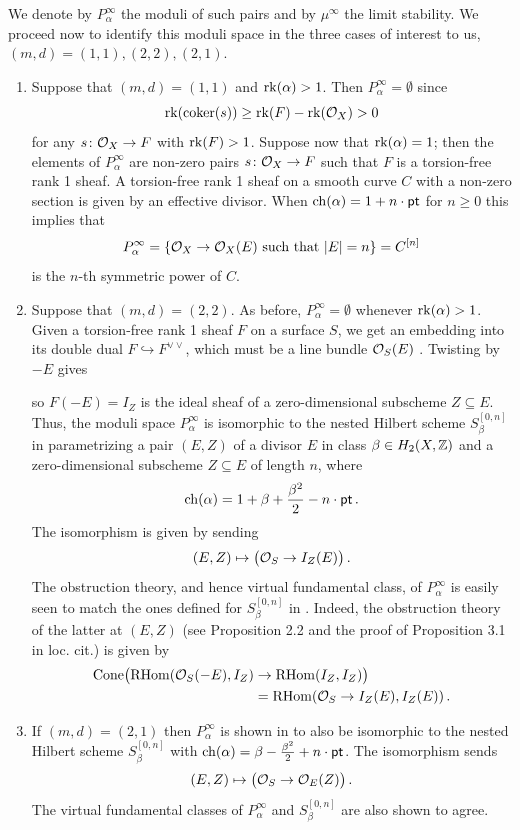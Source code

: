 \documentclass[a4paper, 12pt]{amsart}
\begin{document}
We denote by $P_\alpha^\infty$ the moduli of such pairs and by $\mu^\infty$ the limit stability. We proceed now to identify this moduli space in the three cases of interest to us, $(m,d)=(1,1), (2,2), (2,1)$.
\begin{enumerate}
\item Suppose that $(m,d)=(1,1)$ and $\mathrm{rk}(\alpha)>1$. Then $P_\alpha^\infty=\emptyset$ since \[\mathrm{rk}(\operatorname{coker}(s))\geq \mathrm{rk}(F)-\mathrm{rk}({\mathcal O}_X)>0\] for any $s\colon {\mathcal O}_X\to F$ with $\mathrm{rk}(F)>1$.  Suppose now that $\mathrm{rk}(\alpha)=1$; then the elements of $P_\alpha^\infty$ are non-zero pairs $s\colon {\mathcal O}_X\to F$ such that $F$ is a torsion-free rank 1 sheaf. A torsion-free rank 1 sheaf on a smooth curve $C$ with a non-zero section is given by an effective divisor. When $\mathrm{ch}(\alpha)=1+n \cdot {\mathsf{pt}}$ for $n\geq 0$ this implies that
\[P^\infty_{\alpha}=\{{\mathcal O}_X\to {\mathcal O}_{X}(E)\textup{ such that }|E|=n\}=C^{[n]}\]
is the $n$-th symmetric power of $C$.

\item Suppose that $(m,d)=(2,2)$. As before, $P_\alpha^\infty=\emptyset$ whenever $\mathrm{rk}(\alpha)>1$. Given a torsion-free rank 1 sheaf $F$ on a surface $S$, we get an embedding into its double dual $F\hookrightarrow F^{\vee\vee}$, which must be a line bundle ${\mathcal O}_S(E)$ \cite[Example 1.1.16]{HL}. Twisting by $-E$ gives 
\begin{center}\end{center}
so $F(-E)=I_Z$ is the ideal sheaf of a zero-dimensional subscheme $Z\subseteq E$. Thus, the moduli space $P_{\alpha}^\infty$ is isomorphic to the nested Hilbert scheme $S_\beta^{[0,n]}$ in \cite{gsy} parametrizing a pair $(E,Z)$ of a divisor $E$ in class $\beta\in H_2(X, {\mathbb{Z}})$ and a zero-dimensional subscheme $Z\subseteq E$ of length $n$, where 
\[\mathrm{ch}(\alpha)=1+\beta+\frac{\beta^2}{2}-n\cdot {\mathsf{pt}}\,.\]
The isomorphism is given by sending
\[(E,Z)\mapsto \big({\mathcal O}_S\to I_Z(E)\big)\,.\]
The obstruction theory, and hence virtual fundamental class, of $P_\alpha^\infty$ is easily seen to match the ones defined for $S_\beta^{[0,n]}$ in \cite{gsy}. Indeed, the obstruction theory of the latter at $(E,Z)$ (see Proposition 2.2 and the proof of Proposition 3.1 in loc. cit.) is given by
\begin{align*}\textrm{Cone}\big(\mathrm{RHom}({\mathcal O}_S(-E), I_Z)&\to \mathrm{RHom}(I_Z, I_Z)\big)\\
&=\mathrm{RHom}({\mathcal O}_S\to I_Z(E), I_Z(E))\,.\end{align*}

\item  If $(m,d)=(2,1)$ then $P_{\alpha}^\infty$ is shown in \cite[Proposition 3.1.5]{gsy} to also be isomorphic to the nested Hilbert scheme $S_\beta^{[0,n]}$ with $\mathrm{ch}(\alpha)=\beta-\frac{\beta^2}{2}+n\cdot {\mathsf{pt}}$. The isomorphism sends 
\[(E, Z)\mapsto \big({\mathcal O}_S\to {\mathcal O}_E(Z)\big)\,.\] 
The virtual fundamental classes of $P^\infty_\alpha$ and $S_\beta^{[0,n]}$ are also shown to agree.
\end{enumerate}
\end{document}
